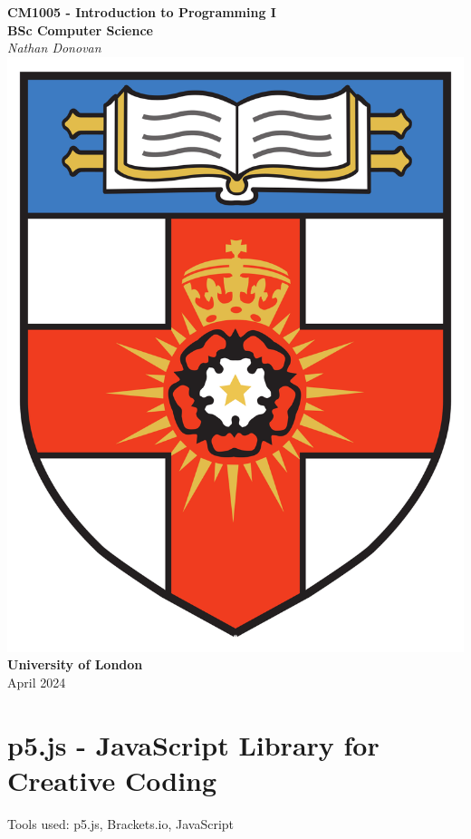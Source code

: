 \documentclass{article}
\begin{document}
\begin{titlepage}
    \centering
    \vspace*{2cm}
    
    {\LARGE\bfseries CM1005 - Introduction to Programming I}\\[0.8cm]
    {\large\bfseries BSc Computer Science}\\[0.5cm] 
    {\large\textit{Nathan Donovan}}\\[1.5cm] 

    \includegraphics[scale=0.1]{../images/university-of-london-logo.png}\\[1.5cm] 
    {\Large\bfseries University of London}\\[1cm]
    {\large April 2024}

    \vfill
    
\end{titlepage}

\newpage
\section{p5.js - JavaScript Library for Creative Coding}
Tools used: p5.js, Brackets.io, JavaScript
\end{document}
